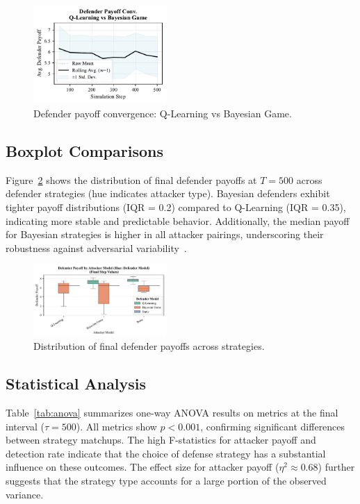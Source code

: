\documentclass[conference]{IEEEtran}
\begin{document}
\begin{figure}[htbp]
  \centering
  \includegraphics[width=0.45\textwidth]{fig_def_convergence.pdf}
  \caption{Defender payoff convergence: Q-Learning vs Bayesian Game.}
  \label{fig:conv_db}
\end{figure}

\subsection{Boxplot Comparisons}
Figure~\ref{fig:def_box} shows the distribution of final defender payoffs at $T=500$ across defender strategies (hue indicates attacker type). Bayesian defenders exhibit tighter payoff distributions (IQR = 0.2) compared to Q-Learning (IQR = 0.35), indicating more stable and predictable behavior. Additionally, the median payoff for Bayesian strategies is higher in all attacker pairings, underscoring their robustness against adversarial variability~\cite{zeng2023comparison}.

\begin{figure}[htbp]
  \centering
  \includegraphics[width=0.45\textwidth]{fig_def_payoff_boxplot.pdf}
  \caption{Distribution of final defender payoffs across strategies.}
  \label{fig:def_box}   
\end{figure}

\subsection{Statistical Analysis}
Table~\ref{tab:anova} summarizes one-way ANOVA results on metrics at the final interval ($\tau=500$). All metrics show $p<0.001$, confirming significant differences between strategy matchups. The high F-statistics for attacker payoff and detection rate indicate that the choice of defense strategy has a substantial influence on these outcomes. The effect size for attacker payoff ($\eta^2 \approx 0.68$) further suggests that the strategy type accounts for a large portion of the observed variance.
\end{document}
